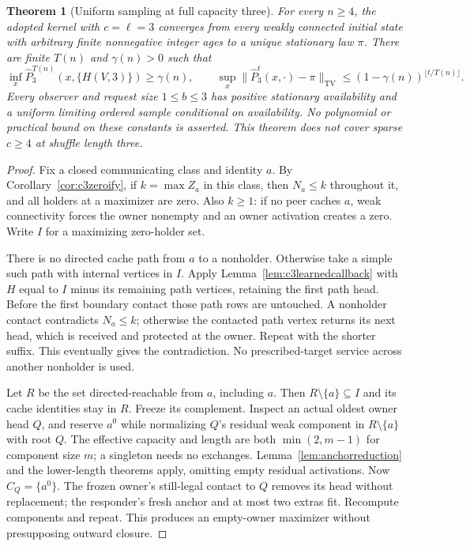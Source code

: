 \documentclass[11pt]{article}
\newtheorem{theorem}{Theorem}
\newcommand{\TV}{\mathrm{TV}}
\begin{document}
\begin{theorem}[Uniform sampling at full capacity three]
\label{thm:c3generaluniform}
For every $n\ge4$, the adopted kernel with $c=\ell=3$
converges from every weakly connected initial state with
arbitrary finite nonnegative integer ages to a unique
stationary law $\pi$. There are finite $T(n)$ and
$\gamma(n)>0$ such that
\[
 \inf_x\widehat P_3^{T(n)}(x,\{H(V,3)\})\ge\gamma(n),\qquad
 \sup_x\|\widehat P_3^t(x,\cdot)-\pi\|_{\TV}
 \le(1-\gamma(n))^{\lfloor t/T(n)\rfloor}.
\]
Every observer and request size $1\le b\le3$ has positive
stationary availability and a uniform limiting ordered sample
conditional on availability. No polynomial or practical bound
on these constants is asserted. This theorem does not cover
sparse $c\ge4$ at shuffle length three.
\end{theorem}
\begin{proof}
Fix a closed communicating class and identity $a$. By
Corollary~\ref{cor:c3zeroify}, if $k=\max Z_a$ in this class,
then $N_a\le k$ throughout it, and all holders at a maximizer
are zero. Also $k\ge1$: if no peer caches $a$, weak
connectivity forces the owner nonempty and an owner activation
creates a zero. Write $I$ for a maximizing zero-holder set.

There is no directed cache path from $a$ to a nonholder.
Otherwise take a simple such path with internal vertices in
$I$. Apply Lemma~\ref{lem:c3learnedcallback} with $H$ equal
to $I$ minus its remaining path vertices, retaining the first
path head. Before the first boundary contact those path rows
are untouched. A nonholder contact contradicts $N_a\le k$;
otherwise the contacted path vertex returns its next head,
which is received and protected at the owner. Repeat with
the shorter suffix. This eventually gives the contradiction.
No prescribed-target service across another nonholder is used.

Let $R$ be the set directed-reachable from $a$, including $a$.
Then $R\setminus\{a\}\subseteq I$ and its cache identities
stay in $R$. Freeze its complement. Inspect an actual oldest
owner head $Q$, and reserve $a^0$ while normalizing $Q$'s
residual weak component in $R\setminus\{a\}$ with root $Q$.
The effective capacity and length are both $\min(2,m-1)$
for component size $m$; a singleton needs no exchanges.
Lemma~\ref{lem:anchorreduction} and the lower-length theorems
apply, omitting empty residual activations. Now $C_Q=\{a^0\}$.
The frozen owner's still-legal contact to $Q$ removes its head
without replacement; the responder's fresh anchor and at most
two extras fit. Recompute components and repeat. This produces
an empty-owner maximizer without presupposing outward closure.


\end{proof}
\end{document}
